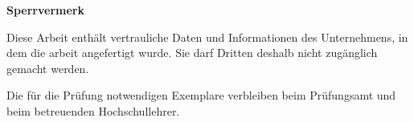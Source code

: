 \thispagestyle{empty}
\textbf{\Large Sperrvermerk}

Diese Arbeit enthält vertrauliche Daten und Informationen des Unternehmens, in dem die \confstudab arbeit angefertigt wurde. Sie darf Dritten deshalb nicht zugänglich gemacht werden.

Die für die Prüfung notwendigen Exemplare verbleiben beim Prüfungsamt und beim betreuenden Hochschullehrer.
\newpage